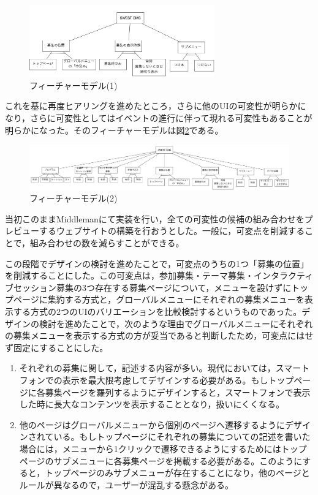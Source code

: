 \documentclass[submit,techrep]{ipsj}
\begin{document}
\begin{figure}[tb]
\includegraphics[width=80mm]{SWEST-feature-model-1.jpg}
\caption{フィーチャーモデル(1)}
\label{fig:SWEST-FM-1}
\end{figure}

これを基に再度ヒアリングを進めたところ，さらに他のUIの可変性が明らかになり，さらに可変性としてはイベントの進行に伴って現れる可変性もあることが明らかになった。そのフィーチャーモデルは図\ref{fig:SWEST-FM-2}である。

\begin{figure}[tb]
\includegraphics[width=170mm]{SWEST-feature-model-2.jpg}
\caption{フィーチャーモデル(2)}
\label{fig:SWEST-FM-2}
\end{figure}

当初このままMiddlemanにて実装を行い，全ての可変性の候補の組み合わせをプレビューするウェブサイトの構築を行おうとした。一般に，可変点を削減することで，組み合わせの数を減らすことができる。

この段階でデザインの検討を進めたことで，可変点のうちの1つ「募集の位置」を削減することにした。この可変点は，参加募集・テーマ募集・インタラクティブセッション募集の3つ存在する募集ページについて，メニューを設けずにトップページに集約する方式と，グローバルメニューにそれぞれの募集メニューを表示する方式の2つのUIのバリエーションを比較検討するというものであった。デザインの検討を進めたことで，次のような理由でグローバルメニューにそれぞれの募集メニューを表示する方式の方が妥当であると判断したため，可変点にはせず固定にすることにした。

\begin{enumerate}
  \item それぞれの募集に関して，記述する内容が多い。現代においては，スマートフォンでの表示を最大限考慮してデザインする必要がある。もしトップページに各募集ページを羅列するようにデザインすると，スマートフォンで表示した時に長大なコンテンツを表示することとなり，扱いにくくなる。
  \item 他のページはグローバルメニューから個別のページへ遷移するようにデザインされている。もしトップページにそれぞれの募集についての記述を書いた場合には，メニューから1クリックで遷移できるようにするためにはトップページのサブメニューに各募集ページを掲載する必要がある。このようにすると，トップページのみサブメニューが存在することになり，他のページとルールが異なるので，ユーザーが混乱する懸念がある。
\end{enumerate}
\end{document}
